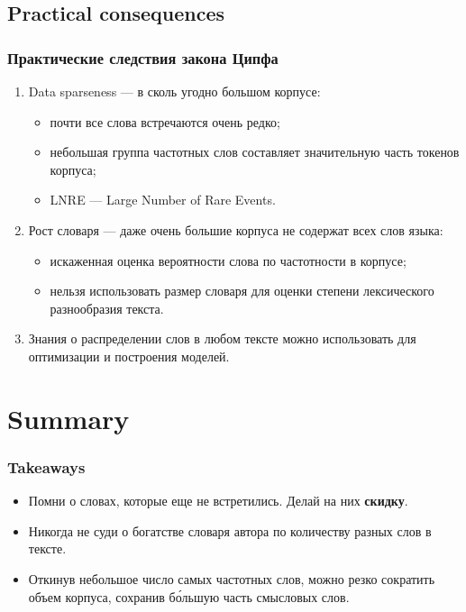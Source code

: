 \documentclass[svgnames]{beamer}
\begin{document}
\subsection{Practical consequences}

\begin{frame}
  \frametitle{Практические следствия закона Ципфа}
  \begin{enumerate}
  \item \alert{Data sparseness} — в сколь угодно большом корпусе:
    \begin{itemize}
    \item почти все слова встречаются очень редко;
    \item небольшая группа частотных слов составляет значительную
      часть токенов корпуса;
    \item LNRE — Large Number of Rare Events. 
    \end{itemize}
  \item \alert{Рост словаря} — даже очень большие корпуса не содержат всех слов языка:
    \begin{itemize}
    \item искаженная оценка вероятности слова по частотности в корпусе;
    \item нельзя использовать размер словаря для оценки степени
      лексического разнообразия текста.
    \end{itemize}
  \item \alert{Знания о распределении} слов в любом тексте можно использовать
    для оптимизации и построения моделей.
  \end{enumerate}
\end{frame}

\section*{Summary}

\begin{frame}
  \frametitle{Takeaways}
  \begin{itemize}
  \item Помни о словах, которые еще не встретились. Делай на них
    \textbf{скидку}. 
  \item Никогда не суди о богатстве словаря автора по количеству разных слов в
    тексте. 
  \item Откинув небольшое число самых частотных слов, можно резко
    сократить объем корпуса, сохранив б\'{о}льшую часть смысловых слов.
  \end{itemize}
\end{frame}
\end{document}

